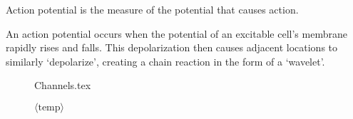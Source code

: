 \documentclass[../../Orator]{subfiles}
\begin{document}
Action potential is the measure of the potential that causes action.

An action potential occurs when the potential of an excitable cell's membrane rapidly rises and falls. This depolarization then causes adjacent locations to similarly `depolarize', creating a chain reaction in the form of a `wavelet'.



\begin{figure}[ht]

    \centering
    {Channels.tex}
    \caption{ $\langle \text{temp} \rangle$ }\label{fig:Channels}
    
\end{figure}
\end{document}
